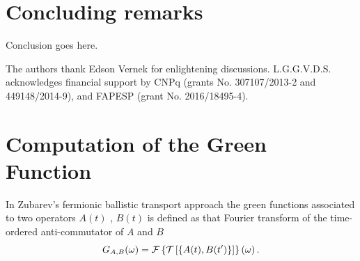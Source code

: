 \documentclass[showpacs,aps,prb,reprint,superscriptaddress]{revtex4-1}
\newcommand{\LUIS}[1]{\textcolor{blue}{\fbox{Luis} {\sl#1}}}
\begin{document}
    

 
 












    
\section{Concluding remarks}
\label{sec:Conclusions}

Conclusion goes here.

\begin{acknowledgments}
The authors thank Edson Vernek for enlightening discussions.  L.G.G.V.D.S. acknowledges financial support by CNPq (grants No. 307107/2013-2 and 449148/2014-9), and FAPESP (grant No. 2016/18495-4).
\end{acknowledgments}





%


 \appendix

 
 \section{Computation of the Green Function \label{sec:Appendix_alg}}
 In Zubarev's fermionic ballistic transport approach \cite{zubarev_double-time_1960} the green functions associated to two operators $A(t)$ , $B(t)$ is defined as that Fourier transform of the time-ordered anti-commutator of $A$ and $B$
\begin{equation}
  G_{A,B}(\omega)= \mathcal{F}\left\{ \mathcal{T}\left[\left\{ A(t),B(t')\right\} \right]\right\} \left(\omega\right).
  \label{eq:greenFunction}
\end{equation}
\end{document}
